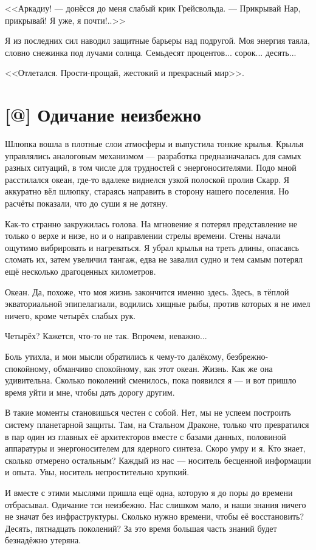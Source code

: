 <<Аркадиу! --- донёсся до меня слабый крик Грейсвольда.
--- Прикрывай Нар, прикрывай!
Я уже, я почти!..>>

Я из последних сил наводил защитные барьеры над подругой.
Моя энергия таяла, словно снежинка под лучами солнца.
Семьдесят процентов... сорок... десять...

<<Отлетался.
Прости-прощай, жестокий и прекрасный мир>>.

\section{[@] Одичание неизбежно}

Шлюпка вошла в плотные слои атмосферы и выпустила тонкие крылья.
Крылья управлялись аналоговым механизмом --- разработка предназначалась для самых разных ситуаций, в том числе для трудностей с энергоносителями.
Подо мной расстилался океан, где-то вдалеке виднелся узкой полоской пролив Скарр.
Я аккуратно вёл шлюпку, стараясь направить в сторону нашего поселения.
Но расчёты показали, что до суши я не дотяну.

Как-то странно закружилась голова.
На мгновение я потерял представление не только о верхе и низе, но и о направлении стрелы времени.
Стены начали ощутимо вибрировать и нагреваться.
Я убрал крылья на треть длины, опасаясь сломать их, затем увеличил тангаж, едва не завалил судно и тем самым потерял ещё несколько драгоценных километров.

Океан.
Да, похоже, что моя жизнь закончится именно здесь.
Здесь, в тёплой экваториальной эпипелагиали, водились хищные рыбы, против которых я не имел ничего, кроме четырёх слабых рук.

Четырёх?
Кажется, что-то не так.
Впрочем, неважно...

Боль утихла, и мои мысли обратились к чему-то далёкому, безбрежно-спокойному, обманчиво спокойному, как этот океан.
Жизнь.
Как же она удивительна.
Сколько поколений сменилось, пока появился я --- и вот пришло время уйти и мне, чтобы дать дорогу другим.

В такие моменты становишься честен с собой.
Нет, мы не успеем построить систему планетарной защиты.
Там, на Стальном Драконе, только что превратился в пар один из главных её архитекторов вместе с базами данных, половиной аппаратуры и энергоносителем для ядерного синтеза.
Скоро умру и я.
Кто знает, сколько отмерено остальным?
Каждый из нас --- носитель бесценной информации и опыта.
Увы, носитель непростительно хрупкий.

И вместе с этими мыслями пришла ещё одна, которую я до поры до времени отбрасывал.
Одичание тси неизбежно.
Нас слишком мало, и наши знания ничего не значат без инфраструктуры.
Сколько нужно времени, чтобы её восстановить?
Десять, пятнадцать поколений?
За это время большая часть знаний будет безнадёжно утеряна.

